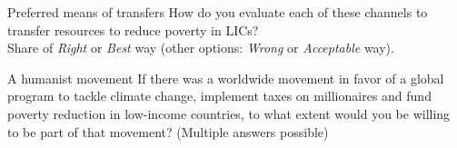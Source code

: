 \documentclass[aspectratio=169,xcolor=dvipsnames, 11pt,mathserif]{beamer}
\begin{document}
\begin{frame}{Preferred means of transfers}
    \vspace*{.5cm}
\centering How do you evaluate each of these channels to transfer resources to reduce poverty in LICs?\\ Share of \textit{Right} or \textit{Best} way (other options: \textit{Wrong} or \textit{Acceptable} way).
\end{frame}


\begin{frame}{A humanist movement}
\centering If there was a worldwide movement in favor of a global program to tackle climate change, implement taxes on millionaires and fund poverty reduction in low-income countries, to what extent would you be willing to be part of that movement? (Multiple answers possible)
\end{frame}
\end{document}
